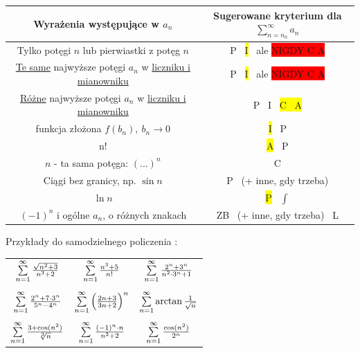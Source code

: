 \begin{table}[!htbp]
    \centering
    \begin{adjustbox}{width=0.9\textwidth}
    \begin{tabular}{|c|c|}
    \hline
    Wyrażenia występujące w $a_n$ & Sugerowane kryterium dla $ \sum\limits_{n=n_0}^{\infty} a_n $ \\[15pt] \hline
    Tylko potęgi $n$ lub pierwiastki z potęg $n$ & P \ \colorbox{yellow}{I} \ ale \colorbox{red}{NIGDY C A} \\[10pt] \hline 
    \underline{Te same} najwyższe potęgi $a_n$ w \underline{liczniku i mianowniku} & P \ \colorbox{yellow}{I} \ ale \colorbox{red}{NIGDY C A} \\[10pt] \hline
    \underline{Różne} najwyższe potęgi $a_n$ w \underline{liczniku i mianowniku} & P \ I \ \colorbox{yellow}{C \ A} \\[10pt] \hline
    funkcja złożona $ f(b_n), \ b_n \to 0 $ & \colorbox{yellow}{I} \ P \\[10pt] \hline
    n! & \colorbox{yellow}{A} \ P \\[10pt] \hline
    $n$ - ta sama potęga: $(...)^n$ & C \\[10pt] \hline
    Ciągi bez granicy, np. $\sin n$ & P \ (+ inne, gdy trzeba) \\[10pt] \hline
    $\ln n$ & \colorbox{yellow}{P} \ $\int$ \\[10pt] \hline
    $(-1)^n$ i ogólne $a_n$, o różnych znakach & ZB \ (+ inne, gdy trzeba) \ L \\[10pt] \hline
    \end{tabular}
\end{adjustbox}
\end{table}

\pagebreak

Przykłady do samodzielnego policzenia : \\

\begin{adjustbox}{width=0.7\textwidth}
    \begin{tabular}{ccc}
        $ \sum\limits_{n = 1}^{\infty} \frac{\sqrt{n^2 + 3}}{n^3 + 2} $ & $ \sum\limits_{n = 1}^{\infty} \frac{n^3 + 5}{n!} $ & $ \sum\limits_{n = 1}^{\infty} \frac{2^n + 3^n}{n^2 \cdot 3^n + 1} $ \\
        \\
        $ \sum\limits_{n = 1}^{\infty} \frac{2^n + 7 \cdot 3^n}{5^n - 4^n} $ & $ \sum\limits_{n = 1}^{\infty} \left( \frac{2n+3}{3n+2} \right)^n $ & $ \sum\limits_{n = 1}^{\infty} \arctan \frac{1}{\sqrt{n}} $ \\
        \\
        $ \sum\limits_{n = 1}^{\infty} \frac{3 + \cos (n^2)}{\sqrt[3]{n}} $ & $ \sum\limits_{n = 1}^{\infty} \frac{(-1)^n \cdot n}{n^2 + 2} $ & $ \sum\limits_{n = 1}^{\infty} \frac{\cos (n^2)}{2^n} $
        \\
    \end{tabular}    
\end{adjustbox}